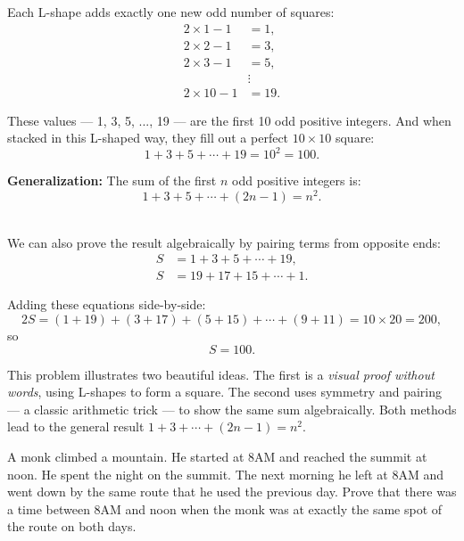 \documentclass{article}
\begin{document}
\begin{soln}
    Each L-shape adds exactly one new odd number of squares:
    \[
        \begin{aligned}
            2 \times 1 - 1 &= 1, \\
            2 \times 2 - 1 &= 3, \\
            2 \times 3 - 1 &= 5, \\
            &\vdots \\
            2 \times 10 - 1 &= 19.
        \end{aligned}
    \]

    These values — 1, 3, 5, ..., 19 — are the first 10 odd positive integers. And when stacked in this L-shaped way, they fill out a perfect \( 10 \times 10 \) square:
    \[
        1 + 3 + 5 + \cdots + 19 = 10^2 = \boxed{100}.
    \]

    \textbf{Generalization:} The sum of the first \( n \) odd positive integers is:
    \[
        \boxed{1 + 3 + 5 + \cdots + (2n - 1) = n^2}.
    \]
\end{soln}

\begin{soln}\ \\\indent
    We can also prove the result algebraically by pairing terms from opposite ends:
    \[
        \begin{aligned}
        S &= 1 + 3 + 5 + \cdots + 19, \\
        S &= 19 + 17 + 15 + \cdots + 1.
        \end{aligned}
    \]

    Adding these equations side-by-side:
    \[
        2S = (1+19) + (3+17) + (5+15) + \cdots + (9+11) = 10 \times 20 = 200,
    \]
    so
    \[
        S = \boxed{100}.
    \]
\end{soln}

\begin{remark*}
    This problem illustrates two beautiful ideas. The first is a \emph{visual proof without words}, using L-shapes to form a square. The second uses symmetry and pairing — a classic arithmetic trick — to show the same sum algebraically. Both methods lead to the general result \( 1 + 3 + \cdots + (2n - 1) = n^2 \).
\end{remark*}


\begin{example}\label{example:monk-same-spot}
    A monk climbed a mountain. He started at 8AM and reached the summit at noon. He spent the night on the summit. The next morning he left at 8AM and went down by the same route that he used the previous day. Prove that there was a time between 8AM and noon when the monk was at exactly the same spot of the route on both days.
      
\end{example}
\end{document}

